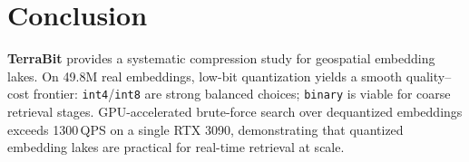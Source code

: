 \documentclass{article}
\newcommand{\method}{\textbf{TerraBit}}
\begin{document}
\section{Conclusion}
\label{sec:conclusion}

\method{} provides a systematic compression study for geospatial embedding lakes.
On 49.8M real embeddings, low-bit quantization yields a smooth quality--cost frontier: \texttt{int4}/\texttt{int8} are strong balanced choices; \texttt{binary} is viable for coarse retrieval stages.
GPU-accelerated brute-force search over dequantized embeddings exceeds \num{1300}\,QPS on a single RTX 3090, demonstrating that quantized embedding lakes are practical for real-time retrieval at scale.



\end{document}
